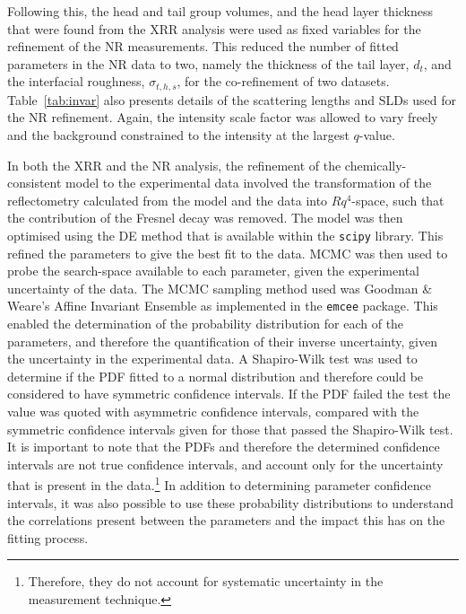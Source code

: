 Following this, the head and tail group volumes, and the head layer thickness that were found from the XRR analysis were used as fixed variables for the refinement of the NR measurements.
This reduced the number of fitted parameters in the NR data to two, namely the thickness of the tail layer, $d_t$, and the interfacial roughness, $\sigma_{t,h,s}$, for the co-refinement of two datasets.
Table~\ref{tab:invar} also presents details of the scattering lengths and SLDs used for the NR refinement.
Again, the intensity scale factor was allowed to vary freely and the background constrained to the intensity at the largest $q$-value.

In both the XRR and the NR analysis, the refinement of the chemically-consistent model to the experimental data involved the transformation of the reflectometry calculated from the model and the data into $Rq^4$-space, such that the contribution of the Fresnel decay was removed.\autocite{gerelli_aurore_2016}
The model was then optimised using the DE method that is available within the \texttt{scipy} library.\autocite{jones_scipy_nodate}
This refined the parameters to give the best fit to the data.
MCMC was then used to probe the search-space available to each parameter, given the experimental uncertainty of the data.
The MCMC sampling method used was Goodman \& Weare's Affine Invariant Ensemble\autocite{goodman_ensemble_2010} as implemented in the \texttt{emcee} package.\autocite{foreman-mackey_emcee_2013}
This enabled the determination of the probability distribution for each of the parameters, and therefore the quantification of their inverse uncertainty, given the uncertainty in the experimental data.
A Shapiro-Wilk test\autocite[this is a common test to assess the normality of a distribution]{shapiro_analysis_1965} was used to determine if the PDF fitted to a normal distribution and therefore could be considered to have symmetric confidence intervals.
If the PDF failed the test the value was quoted with asymmetric confidence intervals, compared with the symmetric confidence intervals given for those that passed the Shapiro-Wilk test.
It is important to note that the PDFs and therefore the determined confidence intervals are not true confidence intervals, and account only for the uncertainty that is present in the data.\footnote{Therefore, they do not account for systematic uncertainty in the measurement technique.}
In addition to determining parameter confidence intervals, it was also possible to use these probability distributions to understand the correlations present between the parameters and the impact this has on the fitting process.

